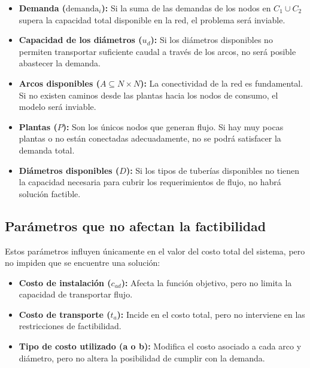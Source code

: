 \documentclass[12pt]{article}
\begin{document}
\begin{itemize}
    \item \textbf{Demanda ($\text{demanda}_i$):} Si la suma de las demandas de los nodos en $C_1 \cup C_2$ supera la capacidad total disponible en la red, el problema será inviable.
    
    \item \textbf{Capacidad de los diámetros ($u_d$):} Si los diámetros disponibles no permiten transportar suficiente caudal a través de los arcos, no será posible abastecer la demanda.

    \item \textbf{Arcos disponibles ($A \subseteq N \times N$):} La conectividad de la red es fundamental. Si no existen caminos desde las plantas hacia los nodos de consumo, el modelo será inviable.

    \item \textbf{Plantas ($P$):} Son los únicos nodos que generan flujo. Si hay muy pocas plantas o no están conectadas adecuadamente, no se podrá satisfacer la demanda total.

    \item \textbf{Diámetros disponibles ($D$):} Si los tipos de tuberías disponibles no tienen la capacidad necesaria para cubrir los requerimientos de flujo, no habrá solución factible.
\end{itemize}

\subsection*{Parámetros que no afectan la factibilidad}

Estos parámetros influyen únicamente en el valor del costo total del sistema, pero no impiden que se encuentre una solución:

\begin{itemize}
    \item \textbf{Costo de instalación ($c_{ad}$):} Afecta la función objetivo, pero no limita la capacidad de transportar flujo.
    
    \item \textbf{Costo de transporte ($t_a$):} Incide en el costo total, pero no interviene en las restricciones de factibilidad.

    \item \textbf{Tipo de costo utilizado (a o b):} Modifica el costo asociado a cada arco y diámetro, pero no altera la posibilidad de cumplir con la demanda.
\end{itemize}
\end{document}
